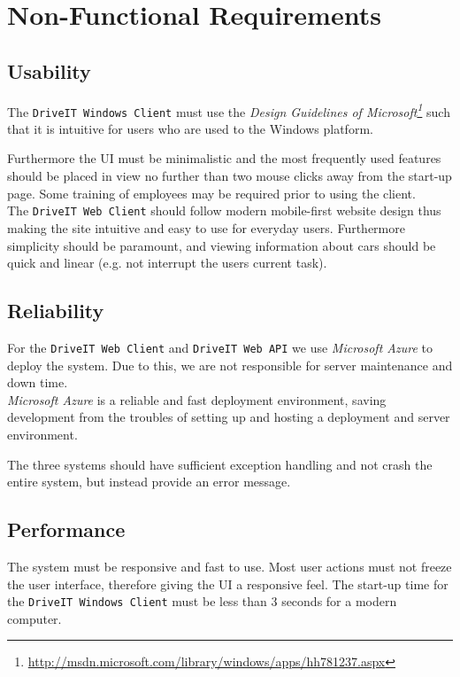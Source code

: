 \section{Non-Functional Requirements}
\subsection{Usability}
The \texttt{DriveIT Windows Client} must use the \textit{Design Guidelines of Microsoft\footnote{\url{http://msdn.microsoft.com/library/windows/apps/hh781237.aspx}}} such that it is intuitive for users who are used to the Windows platform.

Furthermore the UI must be minimalistic and the most frequently used features should be placed in view no further than two mouse clicks away from the start-up page. Some training of employees may be required prior to using the client.\\

The \texttt{DriveIT Web Client} should follow modern mobile-first website design thus making the site intuitive and easy to use for everyday users. Furthermore simplicity should be paramount, and viewing information about cars should be quick and linear (e.g. not interrupt the users current task).

\subsection{Reliability}
For the \texttt{DriveIT Web Client} and \texttt{DriveIT Web API} we use \textit{Microsoft Azure} to deploy the system. Due to this, we are not responsible for server maintenance and down time. \\
\textit{Microsoft Azure} is a reliable and fast deployment environment, saving development from the troubles of setting up and hosting a deployment and server environment.

The three systems should have sufficient exception handling and not crash the entire system, but instead provide an error message.

\subsection{Performance}
The system must be responsive and fast to use. Most user actions must not freeze the user interface, therefore giving the UI a responsive feel. The start-up time for the \texttt{DriveIT Windows Client} must be less than 3 seconds for a modern computer.

